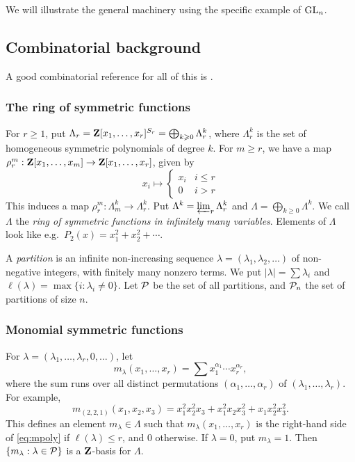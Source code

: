 We will illustrate the general machinery using the specific example of 
$\operatorname{GL}_n$. 





\subsection{Combinatorial background}

A good combinatorial reference for all of this is \cite{m95}. 


\subsubsection{The ring of symmetric functions}

For $r\geqslant 1$, put 
$\Lambda_r = \mathbf{Z}[x_1,\dots,x_r]^{S_r} = \bigoplus_{k\geqslant 0} \Lambda_r^k$, 
where $\Lambda_r^k$ is the set of homogeneous symmetric polynomials of degree 
$k$. For $m\geqslant r$, we have a map 
$\rho_r^m:\mathbf{Z}[x_1,\dots,x_m] \to \mathbf{Z}[x_1,\dots,x_r]$, given by 
\[
  x_i \mapsto \begin{cases} x_i & i\leqslant r \\ 0 & i>r \end{cases}
\]
This induces a map $\rho_r^m:\Lambda_m^k \to \Lambda_r^k$. Put 
$\Lambda^k = \varprojlim_r \Lambda_r^k$ and 
$\Lambda = \bigoplus_{k\geqslant 0} \Lambda^k$. We call $\Lambda$ the 
\emph{ring of symmetric functions in infinitely many variables}. Elements of 
$\Lambda$ look like e.g.\ $P_2(x) = x_1^2 + x_2^2 + \cdots$. 

A \emph{partition} is an infinite non-increasing sequence 
$\lambda=(\lambda_1,\lambda_2,\dots)$ of non-negative integers, with finitely 
many nonzero terms. We put $|\lambda| = \sum \lambda_i$ and 
$\ell(\lambda) = \max\{i:\lambda_i\ne 0\}$. Let $\mathcal{P}$ be the set of all 
partitions, and $\mathcal{P}_n$ the set of partitions of size $n$. 


\subsubsection{Monomial symmetric functions}

For $\lambda=(\lambda_1,\dots,\lambda_r,0,\dots)$, let 
\[
  m_\lambda(x_1,\dots,x_r) = \sum x_1^{\alpha_1} \dotsm x_r^{\alpha_r} ,
\]
where the sum runs over all distinct permutations $(\alpha_1,\dots,\alpha_r)$ of 
$(\lambda_1,\dots,\lambda_r)$. For example, 
\begin{equation}\label{eq:mpoly}
  m_{(2,2,1)}(x_1,x_2,x_3) = x_1^2 x_2^2 x_3 + x_1^2 x_2 x_3^2 + x_1 x_2^2 x_3^2 .
\end{equation}
This defines an element $m_\lambda\in \Lambda$ such that 
$m_\lambda(x_1,\dots,x_r)$ is the right-hand side of \eqref{eq:mpoly} if 
$\ell(\lambda)\leqslant r$, and $0$ otherwise. If $\lambda=0$, put 
$m_\lambda=1$. Then $\{m_\lambda:\lambda\in \mathcal{P}\}$ is a $\mathbf{Z}$-basis for 
$\Lambda$. 


